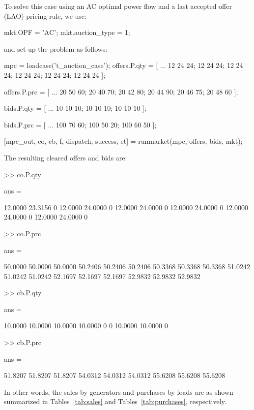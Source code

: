 \documentclass[12pt]{article}
\numberwithin{equation}{section}
\numberwithin{table}{section}
\numberwithin{figure}{section}
\begin{document}
\begin{appendices}
To solve this case using an AC optimal power flow and a last accepted offer (LAO) pricing rule, we use:

\begin{Code}
mkt.OPF = 'AC';
mkt.auction_type = 1;
\end{Code}
\pagebreak
\noindent
and set up the problem as follows:
\begin{Code}
mpc = loadcase('t_auction_case');
offers.P.qty = [ ...
	12 24 24;
	12 24 24;
	12 24 24;
	12 24 24;
	12 24 24;
	12 24 24 ];

offers.P.prc = [ ...
	20 50 60;
	20 40 70;
	20 42 80;
	20 44 90;
	20 46 75;
	20 48 60 ];

bids.P.qty = [ ...
	10 10 10;
	10 10 10;
	10 10 10 ];
	
bids.P.prc = [ ...
	100 70 60;
	100 50 20;
	100 60 50 ];

[mpc_out, co, cb, f, dispatch, success, et] = runmarket(mpc, offers, bids, mkt);
\end{Code}
\pagebreak
\noindent
The resulting cleared offers and bids are:
\begin{Code}
>> co.P.qty

ans =

   12.0000   23.3156         0
   12.0000   24.0000         0
   12.0000   24.0000         0
   12.0000   24.0000         0
   12.0000   24.0000         0
   12.0000   24.0000         0
 
>> co.P.prc

ans =

   50.0000   50.0000   50.0000
   50.2406   50.2406   50.2406
   50.3368   50.3368   50.3368
   51.0242   51.0242   51.0242
   52.1697   52.1697   52.1697
   52.9832   52.9832   52.9832

>> cb.P.qty

ans =

   10.0000   10.0000   10.0000
   10.0000         0         0
   10.0000   10.0000         0

>> cb.P.prc

ans =

   51.8207   51.8207   51.8207
   54.0312   54.0312   54.0312
   55.6208   55.6208   55.6208
\end{Code}

\pagebreak
In other words, the sales by generators and purchases by loads are as shown summarized in Tables~\ref{tab:sales} and Tables~\ref{tab:purchases}, respectively.


\end{appendices}
\end{document}
